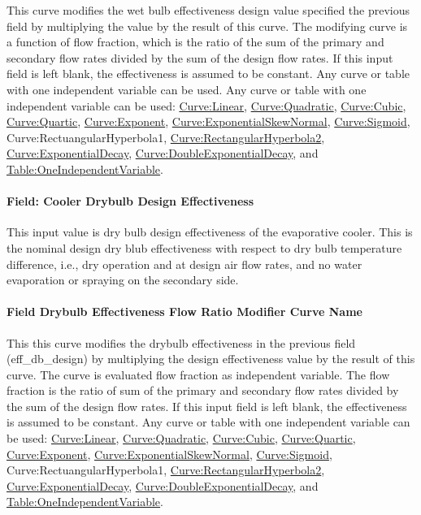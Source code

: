 This curve modifies the wet bulb effectiveness design value specified the previous field by multiplying the value by the result of this curve. The modifying curve is a function of flow fraction, which is the ratio of the sum of the primary and secondary flow rates divided by the sum of the design flow rates. If this input field is left blank, the effectiveness is assumed to be constant. Any curve or table with one independent variable can be used. Any curve or table with one independent variable can be used: \hyperref[curvelinear]{Curve:Linear}, \hyperref[curvequadratic]{Curve:Quadratic}, \hyperref[curvecubic]{Curve:Cubic}, \hyperref[curvequartic]{Curve:Quartic}, \hyperref[curveexponent]{Curve:Exponent}, \hyperref[curveexponentialskewnormal]{\hyperref[curveexponent]{Curve:Exponent}ialSkewNormal}, \hyperref[curvesigmoid]{Curve:Sigmoid}, Curve:RectuangularHyperbola1, \hyperref[curverectangularhyperbola2]{Curve:RectangularHyperbola2}, \hyperref[curveexponentialdecay]{\hyperref[curveexponent]{Curve:Exponent}ialDecay}, \hyperref[curvedoubleexponentialdecay]{Curve:DoubleExponentialDecay}, and \hyperref[tableoneindependentvariable]{Table:OneIndependentVariable}.

\paragraph{Field: Cooler Drybulb Design Effectiveness}\label{field-cooler-drybulb-design-effectiveness}

This input value is dry bulb design effectiveness of the evaporative cooler. This is the nominal design dry blub effectiveness with respect to dry bulb temperature difference, i.e., dry operation and at design air flow rates, and no water evaporation or spraying on the secondary side.

\paragraph{Field Drybulb Effectiveness Flow Ratio Modifier Curve Name}\label{field-drybulb-effectiveness-flow-ratio-modifier-curve-name}

This this curve modifies the drybulb effectiveness in the previous field (eff\_db\_design) by multiplying the design effectiveness value by the result of this curve. The curve is evaluated flow fraction as independent variable. The flow fraction is the ratio of sum of the primary and secondary flow rates divided by the sum of the design flow rates. If this input field is left blank, the effectiveness is assumed to be constant. Any curve or table with one independent variable can be used: \hyperref[curvelinear]{Curve:Linear}, \hyperref[curvequadratic]{Curve:Quadratic}, \hyperref[curvecubic]{Curve:Cubic}, \hyperref[curvequartic]{Curve:Quartic}, \hyperref[curveexponent]{Curve:Exponent}, \hyperref[curveexponentialskewnormal]{\hyperref[curveexponent]{Curve:Exponent}ialSkewNormal}, \hyperref[curvesigmoid]{Curve:Sigmoid}, Curve:RectuangularHyperbola1, \hyperref[curverectangularhyperbola2]{Curve:RectangularHyperbola2}, \hyperref[curveexponentialdecay]{\hyperref[curveexponent]{Curve:Exponent}ialDecay}, \hyperref[curvedoubleexponentialdecay]{Curve:DoubleExponentialDecay}, and \hyperref[tableoneindependentvariable]{Table:OneIndependentVariable}.

